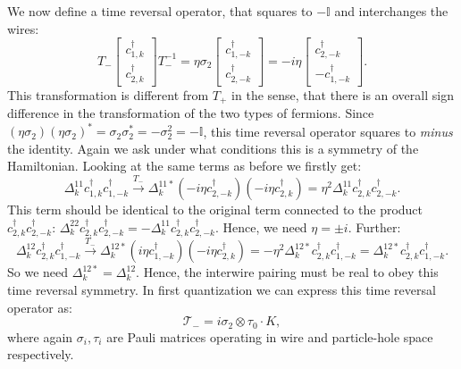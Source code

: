 We now define a time reversal operator, that squares to $-\mathbb{I}$ and interchanges the wires:
\begin{equation}
T_-\begin{bmatrix} c^\dagger_{1,k} \\ c^\dagger_{2,k} \end{bmatrix} T_-^{-1} = \eta\sigma_2 \begin{bmatrix} c^\dagger_{1,-k} \\ c^\dagger_{2,-k} \end{bmatrix} = -i\eta\begin{bmatrix} c^\dagger_{2,-k} \\ - c^\dagger_{1,-k} \end{bmatrix}.\nonumber
\end{equation} 
This transformation is different from $T_+$ in the sense, that there is an overall sign difference in the transformation of the two types of fermions. Since $(\eta \sigma_2)(\eta \sigma_2)^* = \sigma_2\sigma_2^* = - \sigma_2^2 = - \mathbb{I}$, this time reversal operator squares to \textit{minus} the identity. Again we ask under what conditions this is a symmetry of the Hamiltonian. Looking at the same terms as before we firstly get:
\begin{equation}
\Delta^{11}_k c^\dagger_{1,k}c^\dagger_{1,-k} \overset{T_-}{\to} \Delta^{11*}_k \left(-i\eta c^\dagger_{2,-k}\right)\left(-i\eta c^\dagger_{2,k}\right) = \eta^2\Delta^{11}_k c^\dagger_{2,k}c^\dagger_{2,-k}. \nonumber
\end{equation}
This term should be identical to the original term connected to the product $c^\dagger_{2,k}c^\dagger_{2,-k}$: $\Delta^{22}_k c^\dagger_{2,k}c^\dagger_{2,-k} = -\Delta^{11}_k c^\dagger_{2,k}c^\dagger_{2,-k}$. Hence, we need $\eta = \pm i$. Further:
\begin{equation}
\Delta^{12}_k c^\dagger_{2,k}c^\dagger_{1,-k} \overset{T_-}{\to} \Delta^{12*}_k \left(i\eta c^\dagger_{1,-k}\right)\left(-i\eta c^\dagger_{2,k}\right) = -\eta^2 \Delta^{12*}_k c^\dagger_{2,k}c^\dagger_{1,-k} = \Delta^{12*}_k c^\dagger_{2,k}c^\dagger_{1,-k}. \nonumber
\end{equation}
So we need $\Delta^{12*}_k = \Delta^{12}_k$. Hence, the interwire pairing must be real to obey this time reversal symmetry. In first quantization we can express this time reversal operator as:
\begin{equation}
\mathcal{T}_- = i\sigma_2\otimes\tau_0 \cdot K, 
\label{eq.2wiresTminuswireexchangefirstquantization}
\end{equation}
where again $\sigma_i, \tau_i$ are Pauli matrices operating in wire and particle-hole space respectively. 

